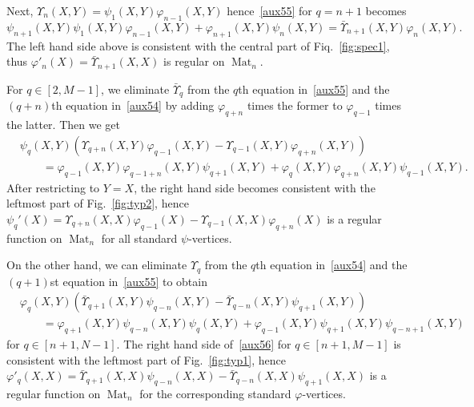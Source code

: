 \documentclass{amsart}
\theoremstyle{definition}
\theoremstyle{remark}
\numberwithin{equation}{section}
\numberwithin{theorem}{section}
\begin{document}
Next, $\Upsilon_n(X,Y)={{\psi}}_1(X,Y){{\varphi}}_{n-1}(X,Y)$ 
hence~\eqref{aux55} for $q=n+1$ becomes
\begin{equation*}
{{\psi}}_{n+1}(X,Y) {{\psi}}_{1}(X,Y) {{\varphi}}_{n-1}(X,Y) + {{\varphi}}_{n+1}(X,Y) {{\psi}}_{n}(X,Y) = 
\bar\Upsilon_{n+1}(X,Y) {{\varphi}}_{n}(X,Y).
\end{equation*}
The left hand side above is consistent with the central part of Fiq.~\ref{fig:spec1}, 
thus ${{\varphi}}'_{n}(X)=\bar\Upsilon_{n+1}(X,X)$ is regular on ${\operatorname{Mat}}_n$.

For $q\in [2,M-1]$, we eliminate $\bar\Upsilon_q$ from the $q$th equation in~\eqref{aux55} and 
the $(q+n)$th equation in~\eqref{aux54} by adding ${{\varphi}}_{q+n}$ times the former to ${{\varphi}}_{q-1}$ 
times the latter. Then we get
\begin{equation*}
\begin{aligned}
&{{\psi}}_{q}(X,Y) \left (\Upsilon_{q+n}(X,Y){{\varphi}}_{q-1}(X,Y) - \Upsilon_{q-1}(X,Y){{\varphi}}_{q+n}(X,Y)\right ) \\
& \qquad =  {{\varphi}}_{q-1}(X,Y) {{\varphi}}_{q-1+n}(X,Y){{\psi}}_{q+1}(X,Y) + {{\varphi}}_{q}(X,Y) {{\varphi}}_{q+n}(X,Y){{\psi}}_{q-1}(X,Y).
\end{aligned}
\end{equation*}
After restricting to $Y=X$, the right hand side becomes consistent with the leftmost part of Fig.~\ref{fig:typ2}, 
hence ${{\psi}}_{q}'(X)= \Upsilon_{q+n}(X,X){{\varphi}}_{q-1}(X) - \Upsilon_{q-1}(X,X){{\varphi}}_{q+n}(X)$
is a regular function on ${\operatorname{Mat}}_n$  for all standard ${{\psi}}$-vertices.

On the other hand, we can eliminate $\Upsilon_q$ from the $q$th equation in~\eqref{aux54} and 
the$(q+1)$st equation in~\eqref{aux55} to obtain
\begin{equation}
\begin{aligned}
\label{aux56}
&{{\varphi}}_{q}(X,Y) \left (\bar\Upsilon_{q+1}(X,Y){{\psi}}_{q-n}(X,Y) - \bar\Upsilon_{q-n}(X,Y){{\psi}}_{q+1}(X,Y)\right ) \\
& \qquad =  {{\varphi}}_{q+1}(X,Y) {{\psi}}_{q -n }(X,Y){{\psi}}_{q}(X,Y) + {{\varphi}}_{q-1}(X,Y) {{\psi}}_{q+1}(X,Y){{\psi}}_{q-n+1}(X,Y)
\end{aligned}
\end{equation}
for $q\in [n+1,N-1]$. The right hand side of~\eqref{aux56} for $q\in [n+1,M-1]$ is consistent with the leftmost 
part of Fig.~\ref{fig:typ1}, hence 
${{\varphi}}'_{q}(X,X)=\bar\Upsilon_{q+1}(X,X){{\psi}}_{q-n}(X,X) - \bar\Upsilon_{q-n}(X,X){{\psi}}_{q+1}(X,X)$
is a regular function on ${\operatorname{Mat}}_n$ for the corresponding standard ${{\varphi}}$-vertices.
\end{document}
